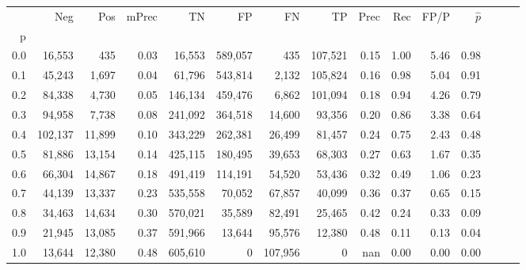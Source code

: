 \begin{tabular}{rrrrrrrrrrrrrrr}
\toprule
{} &      Neg &     Pos & mPrec &       TN &       FP &       FN &       TP &  Prec &   Rec &  FP/P & $\hat{p}$ \\
p   &          &         &       &          &          &          &          &       &       &       &           \\
\midrule
0.0 &   16,553 &     435 &  0.03 &   16,553 &  589,057 &      435 &  107,521 &  0.15 &  1.00 &  5.46 &      0.98 \\
0.1 &   45,243 &   1,697 &  0.04 &   61,796 &  543,814 &    2,132 &  105,824 &  0.16 &  0.98 &  5.04 &      0.91 \\
0.2 &   84,338 &   4,730 &  0.05 &  146,134 &  459,476 &    6,862 &  101,094 &  0.18 &  0.94 &  4.26 &      0.79 \\
0.3 &   94,958 &   7,738 &  0.08 &  241,092 &  364,518 &   14,600 &   93,356 &  0.20 &  0.86 &  3.38 &      0.64 \\
0.4 &  102,137 &  11,899 &  0.10 &  343,229 &  262,381 &   26,499 &   81,457 &  0.24 &  0.75 &  2.43 &      0.48 \\
0.5 &   81,886 &  13,154 &  0.14 &  425,115 &  180,495 &   39,653 &   68,303 &  0.27 &  0.63 &  1.67 &      0.35 \\
0.6 &   66,304 &  14,867 &  0.18 &  491,419 &  114,191 &   54,520 &   53,436 &  0.32 &  0.49 &  1.06 &      0.23 \\
0.7 &   44,139 &  13,337 &  0.23 &  535,558 &   70,052 &   67,857 &   40,099 &  0.36 &  0.37 &  0.65 &      0.15 \\
0.8 &   34,463 &  14,634 &  0.30 &  570,021 &   35,589 &   82,491 &   25,465 &  0.42 &  0.24 &  0.33 &      0.09 \\
0.9 &   21,945 &  13,085 &  0.37 &  591,966 &   13,644 &   95,576 &   12,380 &  0.48 &  0.11 &  0.13 &      0.04 \\
1.0 &   13,644 &  12,380 &  0.48 &  605,610 &        0 &  107,956 &        0 &   nan &  0.00 &  0.00 &      0.00 \\
\bottomrule
\end{tabular}

